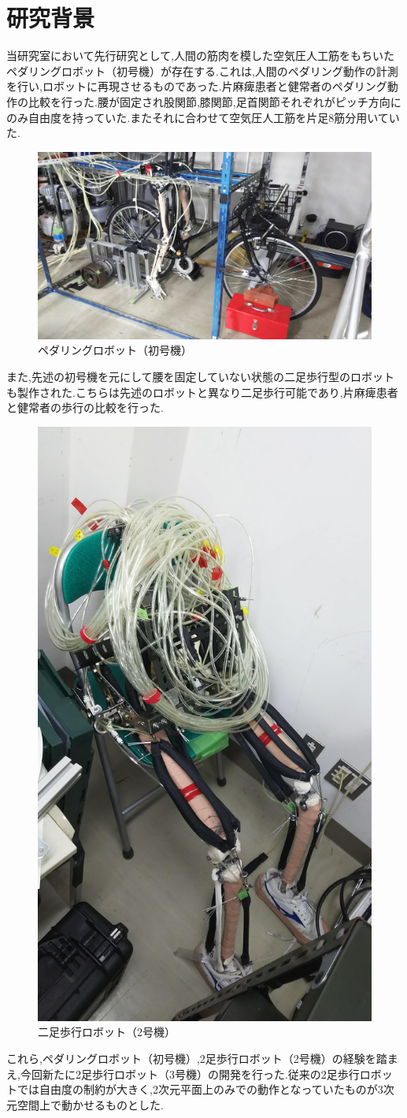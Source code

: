 \section{研究背景}
当研究室において先行研究として,人間の筋肉を模した空気圧人工筋をもちいたペダリングロボット（初号機）が存在する.これは,人間のペダリング動作の計測を行い,ロボットに再現させるものであった.片麻痺患者と健常者のペダリング動作の比較を行った.腰が固定され股関節,膝関節,足首関節それぞれがピッチ方向にのみ自由度を持っていた.またそれに合わせて空気圧人工筋を片足8筋分用いていた.
\begin{figure}[!t]
 \begin{center}
  \includegraphics[width=0.5\columnwidth,clip]{Photo/BackGround/1st.eps}
  \caption{ペダリングロボット（初号機）}
  \label{初号機}
  \end{center}
  \end{figure}

また,先述の初号機を元にして腰を固定していない状態の二足歩行型のロボットも製作された.こちらは先述のロボットと異なり二足歩行可能であり,片麻痺患者と健常者の歩行の比較を行った.
  \begin{figure}
  \begin{center}
  \includegraphics[width=0.25\columnwidth,clip]{Photo/BackGround/2nd.eps}
  \caption{二足歩行ロボット（2号機）}
  \label{2号機}
 \end{center}
\end{figure}

これら,ペダリングロボット（初号機）,2足歩行ロボット（2号機）の経験を踏まえ,今回新たに2足歩行ロボット（3号機）の開発を行った.従来の2足歩行ロボットでは自由度の制約が大きく,2次元平面上のみでの動作となっていたものが3次元空間上で動かせるものとした.

